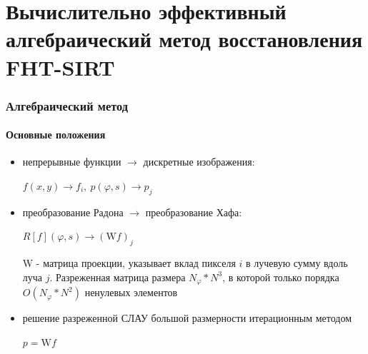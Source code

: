 \documentclass[12pt]{beamer}
\begin{document}
\section{Вычислительно эффективный алгебраический метод восстановления FHT-SIRT}

\begin{frame}
\frametitle{Алгебраический метод}
\framesubtitle{Основные положения}
\begin{itemize}
  \item непрерывные функции $\rightarrow$ дискретные изображения:

    {
    \centering
    $f(x,y) \rightarrow f_i,\ p(\varphi, s) \rightarrow p_j$
    \par
    }
  \vspace{0.5cm}
  \item преобразование Радона $\rightarrow$ преобразование Хафа:
  
    {
    \centering
    $R[f](\varphi, s) \rightarrow (\mathrm W f)_j$ 
    \par
    }
  \vspace{0.5cm}

    $\mathrm W$ - матрица проекции, указывает вклад пикселя $i$ в лучевую сумму вдоль луча $j$.
    Разреженная матрица размера $N_\varphi * N^3$, в которой только порядка $O(N_\varphi * N^2)$ ненулевых элементов
    \vspace{0.5cm}
  \item решение разреженной СЛАУ большой размерности итерационным методом

    {
    \centering
    $p = \mathrm W f$
    \par
    }

\end{itemize}
\end{frame}
\end{document}

